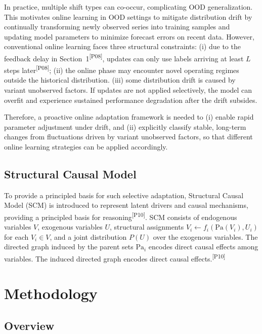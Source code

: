 ﻿\documentclass[journal]{IEEEtran}
\DeclareRobustCommand{\auditbad}[2]{{\color{auditred}#1}{\color{auditred}\textsuperscript{[#2]}}}
\begin{document}
In practice, multiple shift types can co-occur, complicating OOD generalization. This motivates online learning in OOD settings to mitigate distribution drift by continually transforming newly observed series into training samples and updating model parameters to minimize forecast errors on recent data. However, conventional online learning faces three structural constraints: (i) due to the feedback delay in \auditbad{Section~1}{P08}, updates can only use labels arriving at least \auditbad{$L$ steps later}{P08}; (ii) the online phase may encounter novel operating regimes outside the historical distribution. (iii) some distribution drift is caused by variant unobserved factors. If updates are not applied selectively, the model can overfit and experience sustained performance degradation after the drift subsides. 

Therefore, a proactive online adaptation framework is needed to (i) enable rapid parameter adjustment under drift, and (ii) explicitly classify stable, long-term changes from fluctuations driven by variant unobserved factors, so that different online learning strategies can be applied accordingly.

\subsection{Structural Causal Model}

To provide a principled basis for such selective adaptation, \auditbad{Structural Causal Model (SCM) is introduced to represent latent drivers and causal mechanisms, providing a principled basis for reasoning}{P10}. SCM consists of endogenous variables $V$, exogenous variables $U$, structural assignments $V_i \leftarrow f_i(\mathrm{Pa}(V_i), U_i)$ for each $V_i \in V$, and a joint distribution $P(U)$ over the exogenous variables. The directed graph induced by the parent sets $\mathrm{Pa}_i$ encodes direct causal effects among variables. \auditbad{The induced directed graph encodes direct causal effects.}{P10}

\section{Methodology}
\subsection{Overview}
\end{document}
